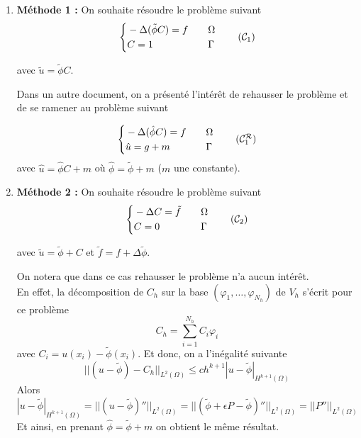 \begin{enumerate}[label=\textbullet]
	\item \textbf{Méthode 1 : }
	On souhaite résoudre le problème suivant
	\begin{equation}
		\label{pbc1}
		\left\{\begin{aligned}
			&-\Delta (\tilde{\phi}C)=f \quad &&\Omega \\
			&C=1 \quad &&\Gamma
		\end{aligned}\right. \tag{$\mathcal{C}_1$}
	\end{equation}
	
	avec $\tilde{u}=\tilde{\phi}C$.
	
	Dans un autre document, on a présenté l'intérêt de rehausser le problème et de se ramener au problème suivant
	
	\begin{equation}
		\left\{\begin{aligned}
			&-\Delta (\hat{\phi}C)=f \quad &&\Omega \\
			&\hat{u}=g+m \quad &&\Gamma
		\end{aligned}\right. \label{pbc1r} \tag{$\mathcal{C}_1^\mathcal{R}$}
	\end{equation}
	avec $\hat{u}=\hat{\phi}C+m$ où $\hat{\phi}=\tilde{\phi}+m$ ($m$ une constante).
	
	
	\item \textbf{Méthode 2 : } On souhaite résoudre le problème suivant
	\begin{equation}
		\label{pbc2}
		\left\{\begin{aligned}
			&-\Delta C=\tilde{f} \quad &&\Omega \\
			&C=0 \quad &&\Gamma
		\end{aligned}\right. \tag{$\mathcal{C}_2$}
	\end{equation}
	
	avec $\tilde{u}=\tilde{\phi}+C$ et $\tilde{f}=f+\Delta\tilde{\phi}$.
	
	\begin{Rem}
		On notera que dans ce cas rehausser le problème n'a aucun intérêt. \\
		En effet, la décomposition de $C_h$ sur la base $(\varphi_1,\dots,\varphi_{N_h})$ de $V_h$ s'écrit pour ce problème			
		$$C_h=\sum_{i=1}^{N_h}C_i\varphi_i$$
		avec $C_i=u(x_i)-\tilde{\phi}(x_i)$.
		Et donc, on a l'inégalité suivante
		$$||(u-\tilde{\phi})-C_h||_{L^2(\Omega)}\le ch^{k+1}|u-\tilde{\phi}|_{H^{k+1}(\Omega)}$$
		Alors
		$$|u-\tilde{\phi}|_{H^{k+1}(\Omega)}=||(u-\tilde{\phi})''||_{L^2(\Omega)}=||(\tilde{\phi}+\epsilon P-\tilde{\phi})''||_{L^2(\Omega)}=||P''||_{L^2(\Omega)}$$
		Et ainsi, en prenant $\hat{\phi}=\tilde{\phi}+m$ on obtient le même résultat.
	\end{Rem}
\end{enumerate}

